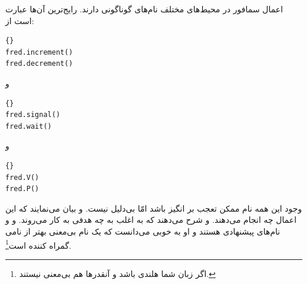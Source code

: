 \documentclass{book}
\begin{document}
    اعمال سمافور در محیط‌های مختلف نام‌های گوناگونی دارند. رایج‌ترین آن‌ها عبارت است از:
%
\begin{latin}
\begin{latin}
\begin{lstlisting}[title=\rl{اعمال سمافور}]{}
fred.increment()
fred.decrement()	
\end{lstlisting}
\end{latin}
\end{latin}
%
و
%
\begin{latin}
\begin{latin}
\begin{lstlisting}[title=\rl{اعمال سمافور}]{}
fred.signal()
fred.wait()	
\end{lstlisting}
\end{latin}
\end{latin}
%
و
%
\begin{latin}
\begin{latin}
\begin{lstlisting}[title=\rl{اعمال سمافور}]{}
fred.V()
fred.P()	
\end{lstlisting}
\end{latin}
\end{latin}
%
    وجود این همه نام ممکن تعجب بر انگیز باشد امّا بی‌دلیل نیست. 
     و 
    بیان می‌نمایند که این اعمال چه انجام می‌دهند. 
     و 
    شرح می‌دهند که به اغلب به چه هدفی به کار می‌روند. و
     و 
    نام‌های پیشنهادی  هستند و او به خوبی می‌دانست که یک نام بی‌معنی بهتر از نامی گمراه کننده است\footnote{
    اگر زبان شما هلندی باشد  و  آنقدرها هم بی‌معنی نیستند.}. 
\end{document}
